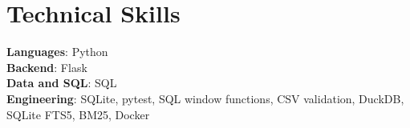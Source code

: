 \section{Technical Skills}
\begin{itemize}[leftmargin=0.15in, label={}]
\small{\item{\strut
\textbf{Languages}: Python \\
\textbf{Backend}: Flask \\
\textbf{Data and SQL}: SQL \\
\textbf{Engineering}: SQLite, pytest, SQL window functions, CSV validation, DuckDB, SQLite FTS5, BM25, Docker \\
}}
\end{itemize}


